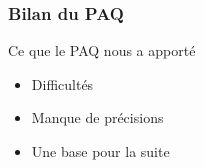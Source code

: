 \begin{frame}
\frametitle{Bilan du PAQ}

\begin{block}{Ce que le PAQ nous a apporté}
\begin{itemize}
	\item Difficultés %
	\item Manque de précisions %
	\item Une base pour la suite %
\end{itemize}
\end{block} %

\end{frame} %



